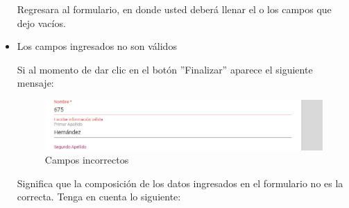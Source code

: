 \begin{itemize}
\begin{figure}[H]
                         \end{figure}

                           Regresara  al formulario, en donde usted deberá llenar el o los campos que dejo vacíos.






                        \item Los campos ingresados no son válidos

                            Si al momento de dar clic en el botón ''Finalizar'' aparece el siguiente mensaje:
                            \clearpage
                                \begin{figure}[H]
                            \centering
                            \includegraphics[width=0.4\linewidth]{images/SP1/MSG35}
                            \caption{Campos incorrectos}
                            \label{mensaje35}

                         \end{figure}


                            Significa que la composición de los datos ingresados en el formulario no es la correcta. Tenga en cuenta lo siguiente:


\end{itemize}
